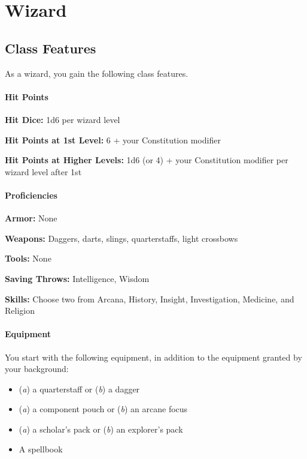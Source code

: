 \documentclass[
]{article}
\date{}
\providecommand{\tightlist}{%
  \setlength{\itemsep}{0pt}\setlength{\parskip}{0pt}}
\begin{document}
\hypertarget{wizard}{%
\section{Wizard}\label{wizard}}

\hypertarget{class-features}{%
\subsection{Class Features}\label{class-features}}

As a wizard, you gain the following class features.

\hypertarget{hit-points}{%
\paragraph{Hit Points}\label{hit-points}}

\textbf{Hit Dice:} 1d6 per wizard level

\textbf{Hit Points at 1st Level:} 6 + your Constitution modifier

\textbf{Hit Points at Higher Levels:} 1d6 (or 4) + your Constitution
modifier per wizard level after 1st

\hypertarget{proficiencies}{%
\paragraph{Proficiencies}\label{proficiencies}}

\textbf{Armor:} None

\textbf{Weapons:} Daggers, darts, slings, quarterstaffs, light crossbows

\textbf{Tools:} None

\textbf{Saving Throws:} Intelligence, Wisdom

\textbf{Skills:} Choose two from Arcana, History, Insight,
Investigation, Medicine, and Religion

\hypertarget{equipment}{%
\paragraph{Equipment}\label{equipment}}

You start with the following equipment, in addition to the equipment
granted by your background:

\begin{itemize}
\tightlist
\item
  (\emph{a}) a quarterstaff or (\emph{b}) a dagger
\item
  (\emph{a}) a component pouch or (\emph{b}) an arcane focus
\item
  (\emph{a}) a scholar's pack or (\emph{b}) an explorer's pack
\item
  A spellbook
\end{itemize}
\end{document}
